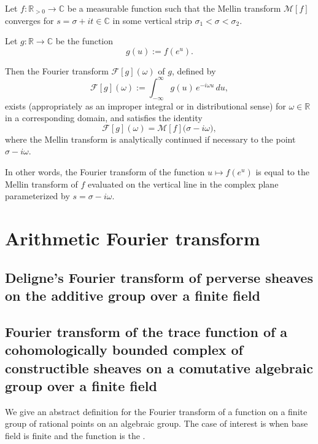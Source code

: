 \begin{theorem}
Let $f: \mathbb{R}_{>0} \to \mathbb{C}$ be a measurable function such that the Mellin transform $\mathcal{M}[f]$ converges for $s = \sigma + i t \in \mathbb{C}$ in some vertical strip $\sigma_1 < \sigma < \sigma_2$.

Let $g : \mathbb{R} \to \mathbb{C}$ be the function
$$ g(u) := f(e^{u}).  $$

Then the Fourier transform $\mathcal{F}[g](\omega)$ of $g$, defined by
$$
\mathcal{F}[g](\omega) := \int_{-\infty}^\infty g(u) \, e^{-i \omega u} \, du,
$$
exists (appropriately as an improper integral or in distributional sense) for $\omega \in \mathbb{R}$ in a corresponding domain, and satisfies the identity
$$
\mathcal{F}[g](\omega) = \mathcal{M}[f]\bigl(\sigma - i \omega\bigr),
$$
where the Mellin transform is analytically continued if necessary to the point $\sigma - i \omega$.

In other words, the Fourier transform of the function $u \mapsto f(e^{u})$ is equal to the Mellin transform of $f$ evaluated on the vertical line in the complex plane parameterized by $s = \sigma - i \omega$.

\end{theorem}

\section{Arithmetic Fourier transform}

\subsection{Deligne's Fourier transform of perverse sheaves on the additive group over a finite field}




\subsection{Fourier transform of the trace function of a cohomologically bounded complex of constructible sheaves on a comutative algebraic group over a finite field}

We give an abstract definition for the Fourier transform of a function on a finite group of rational points on an algebraic group. The case of interest is when base field is finite and the function is the .   

